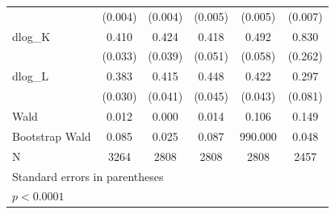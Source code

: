 \begin{table}[htbp]
\begin{tabular}{l*{5}{c}}
            &     (0.004)       &     (0.004)       &     (0.005)       &     (0.005)       &     (0.007)       \\
[1em]
dlog\_K      &       0.410\sym{*}&       0.424\sym{*}&       0.418\sym{*}&       0.492\sym{*}&       0.830       \\
            &     (0.033)       &     (0.039)       &     (0.051)       &     (0.058)       &     (0.262)       \\
[1em]
dlog\_L      &       0.383\sym{*}&       0.415\sym{*}&       0.448\sym{*}&       0.422\sym{*}&       0.297       \\
            &     (0.030)       &     (0.041)       &     (0.045)       &     (0.043)       &     (0.081)       \\
\hline
Wald        &       0.012       &       0.000       &       0.014       &       0.106       &       0.149       \\
Bootstrap Wald&       0.085       &       0.025       &       0.087       &     990.000       &       0.048       \\
N           &        3264       &        2808       &        2808       &        2808       &        2457       \\
\hline\hline
\multicolumn{6}{l}{\footnotesize Standard errors in parentheses}\\
\multicolumn{6}{l}{\footnotesize \sym{*} \(p<0.0001\)}\\
\end{tabular}
\end{table}

